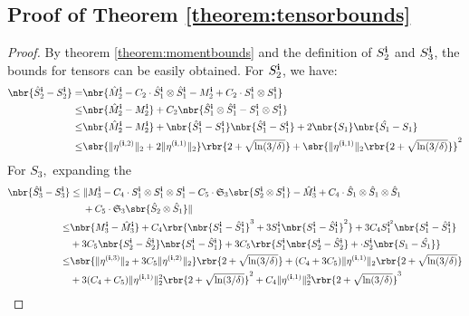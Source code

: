 \documentclass[twoside,11pt]{article}
\newcommand{\symm}{\mathfrak{S}}
\newcommand{\ib}{{\bf i}}
\begin{document}
{\subsection{ Proof of Theorem \ref{theorem:tensorbounds}}
\label{proof:tensorbounds}
\begin{proof}
By theorem \ref{theorem:momentbounds} and the definition of $S_2^{\ib}$ and $S_3^{\ib}$, the bounds for tensors can be easily obtained. For $S_2^{\ib}$, we have:
\begin{equation}
\begin{aligned}
	\nbr{\hat{S}_2^{\ib}- S_2^{\ib}} =&  \nbr{\hat{M}_2^{\ib} - C_2 \cdot \hat{S}_1^{\ib}\otimes \hat{S}_1^{\ib} - M_2^{\ib} + C_2 \cdot S_1^{\ib}\otimes S_1^{\ib}}\\
           \leq& \nbr{\hat{M}_2^{\ib}-M_2^{\ib}} + C_2 \nbr{\hat{S}_1^{\ib} \otimes \hat{S}_1^{\ib} - S_1^{\ib} \otimes S_1^{\ib}}\\
        \leq& \nbr{\hat{M}_2^{\ib}-M_2^{\ib}} + \nbr{\hat{S}_1^{\ib} -S_1^{\ib}}\nbr{\hat{S}_1^{\ib} -S_1^{\ib}}+ 2\nbr{S_1} \nbr{\hat{S_1} -S_1 }\\
       \leq&  \sbr{  \|\eta^{(\ib,2)}\|_2 + 2 \|\eta^{(\ib,1)}\|_2}\rbr{2+\sqrt{\ln (3/\delta)}}+  \sbr{  \|\eta^{(\ib,1)}\|_2 \rbr{2+\sqrt{\ln (3/\delta)}}}^2 
\end{aligned}
\end{equation}
For $S_3,$ expanding the 
\begin{equation}
\begin{aligned}
	\nbr{\hat{S}_3^{\ib} - S_3^{\ib}} 
& \leq \lVert M_3^{\ib} - C_4 \cdot S_1^{\ib} \otimes S_1^{\ib} \otimes S_1^{\ib} - C_5 \cdot \symm_3 \sbr{S_2^{\ib} \otimes S_1^{\ib}} - \hat{M}_3^{\ib} + C_4 \cdot \hat{S}_1 \otimes \hat{S}_1 \otimes \hat{S}_1\\
& \,\,\,\,\,\,\,\, + C_5 \cdot \symm_3 \sbr{\hat{S}_2 \otimes \hat{S}_1} \rVert \\ 
 \leq &\nbr{M_3^{\ib} - \hat{M}_3^{\ib}} + C_4 \rbr{ \nbr{S_1^{\ib}-\hat{S}_1^{\ib}}^3+ 3S_1^{\ib}\nbr{S_1^{\ib}-\hat{S}_1^{\ib}}^2}+ 3C_4 S_1^{\ib^2}\nbr{S_1^{\ib}-\hat{S}_1^{\ib}} \\
 &+  3 C_5\nbr{S_2^{\ib} - \hat{S}_2^{\ib}} \nbr{S_1^{\ib} - \hat{S}_1^{\ib}} + 3 C_5 \rbr{ S_1^{\ib} \nbr{S_2^{\ib} - \hat{S}_2^{\ib}} +\cdot S_2^{\ib} \nbr{S_1- \hat{S_1}} }\\
\leq& \sbr{  \|\eta^{(\ib,3)}\|_2 + 3C_5 \|\eta^{(\ib,2)}\|_2}\rbr{2+\sqrt{\ln (3/\delta)}} +(C_4+3C_5) \|\eta^{(\ib,1)}\|_2 \rbr{2+\sqrt{\ln (3/\delta)}}\\
&+ 3(C_4+C_5) \|\eta^{(\ib,1)}\|_2^2 \rbr{2+\sqrt{\ln (3/\delta)}}^2+ C_4 \|\eta^{(\ib,1)}\|_2^3 \rbr{2+\sqrt{\ln (3/\delta)}}^3
\end{aligned}
\end{equation}
\end{proof}

}
\end{document}
